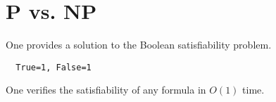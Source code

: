 \setcounter{section}{0}

\section{P vs. NP}
One provides a solution to 
the Boolean satisfiability 
problem.
\begin{center}
  \begin{verbatim}
  True=1, False=1
  \end{verbatim}
\end{center}
One verifies 
the satisfiability 
of any formula in $O(1)$ time.
\begin{center}
\end{center}


